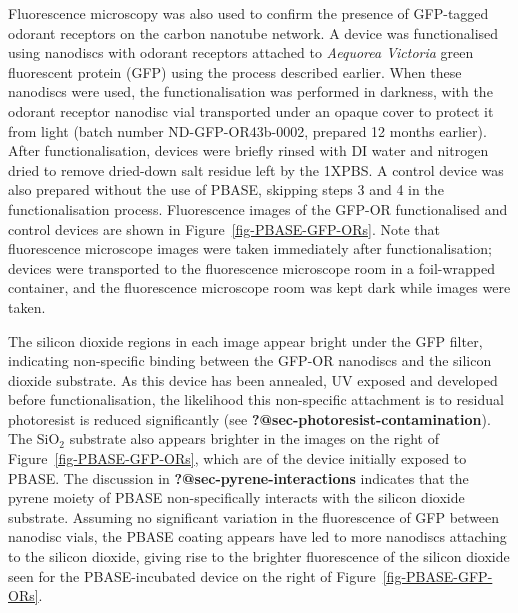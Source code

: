 \documentclass[
  a4paper,
]{scrbook}
\begin{document}
Fluorescence microscopy was also used to confirm the presence of
GFP-tagged odorant receptors on the carbon nanotube network. A device
was functionalised using nanodiscs with odorant receptors attached to
\emph{Aequorea Victoria} green fluorescent protein (GFP) using the
process described earlier. When these nanodiscs were used, the
functionalisation was performed in darkness, with the odorant receptor
nanodisc vial transported under an opaque cover to protect it from light
(batch number ND-GFP-OR43b-0002, prepared 12 months earlier). After
functionalisation, devices were briefly rinsed with DI water and
nitrogen dried to remove dried-down salt residue left by the 1XPBS. A
control device was also prepared without the use of PBASE, skipping
steps 3 and 4 in the functionalisation process. Fluorescence images of
the GFP-OR functionalised and control devices are shown in
Figure~\ref{fig-PBASE-GFP-ORs}. Note that fluorescence microscope images
were taken immediately after functionalisation; devices were transported
to the fluorescence microscope room in a foil-wrapped container, and the
fluorescence microscope room was kept dark while images were taken.

The silicon dioxide regions in each image appear bright under the GFP
filter, indicating non-specific binding between the GFP-OR nanodiscs and
the silicon dioxide substrate. As this device has been annealed, UV
exposed and developed before functionalisation, the likelihood this
non-specific attachment is to residual photoresist is reduced
significantly (see \textbf{?@sec-photoresist-contamination}). The
SiO\(_2\) substrate also appears brighter in the images on the right of
Figure~\ref{fig-PBASE-GFP-ORs}, which are of the device initially
exposed to PBASE. The discussion in \textbf{?@sec-pyrene-interactions}
indicates that the pyrene moiety of PBASE non-specifically interacts
with the silicon dioxide substrate. Assuming no significant variation in
the fluorescence of GFP between nanodisc vials, the PBASE coating
appears have led to more nanodiscs attaching to the silicon dioxide,
giving rise to the brighter fluorescence of the silicon dioxide seen for
the PBASE-incubated device on the right of
Figure~\ref{fig-PBASE-GFP-ORs}.
\end{document}
